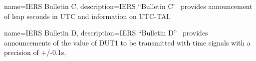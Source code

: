  {
	name={IERS Bulletin C},
	description={\gls{IERS} ``Bulletin C'~\cite{iersBULLETINCProductMetadata} provides announcement of leap seconds in UTC and information on UTC-TAI},
}

 {
	name={IERS Bulletin D},
	description={\gls{IERS} ``Bulletin D''~\cite{iersBULLETINDProductMetadata} provides announcements of the value of DUT1 to be transmitted with time signals with a precision of +/-0.1s},
}

